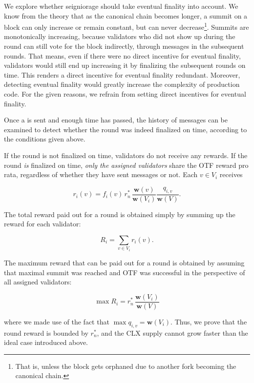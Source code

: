 We explore whether seigniorage should take eventual finality into account. We know from the theory that as the canonical chain becomes longer, a summit on a block can only increase or remain constant, but can never decrease\footnote{That is, unless the block gets orphaned due to another fork becoming the canonical chain.}. Summits are monotonically increasing, because validators who did not show up during the round can still vote for the block indirectly, through messages in the subsequent rounds. That means, even if there were no direct incentive for eventual finality, validators would still end up increasing it by finalizing the subsequent rounds on time. This renders a direct incentive for eventual finality redundant. Moreover, detecting eventual finality would greatly increase the complexity of production code. For the given reasons, we refrain from setting direct incentives for eventual finality.





Once a \PROP is sent and enough time has passed, the history of messages can be examined to detect whether the round was indeed finalized on time, according to the conditions given above.

If the round is not finalized on time, validators do not receive any rewards. If the round \emph{is} finalized on time, \emph{only the assigned validators} share the OTF reward pro rata, regardless of whether they have sent messages or not. Each $v\in V_i$ receives

\begin{equation}
  r_i(v) = f_i(v) \, r^\ast_n \,
  \frac{\boldsymbol{w}(v)}{\boldsymbol{w}(V_i)}
  \frac{q_{i,v}}{\boldsymbol{w}(V)}
  .
\end{equation}

The total reward paid out for a round is obtained simply by summing up the reward for each validator:

\begin{equation}
  R_i = \sum_{v\in V_i} r_i(v)
  .
\end{equation}

The maximum reward that can be paid out for a round is obtained by assuming that maximal summit was reached and OTF was successful in the perspective of all assigned validators:

\begin{equation}
  \max R_i = r^\ast_n \,
  \frac{\boldsymbol{w}(V_i)}{\boldsymbol{w}(V)}
\end{equation}

where we made use of the fact that $\max q_{i,v} = \boldsymbol{w}(V_i)$. Thus, we prove that the round reward is bounded by $r^\ast_n$, and the CLX supply cannot grow faster than the ideal case introduced above.


